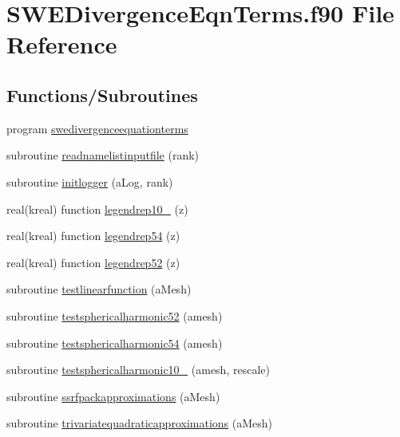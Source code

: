 \hypertarget{SWEDivergenceEqnTerms_8f90}{\section{S\+W\+E\+Divergence\+Eqn\+Terms.\+f90 File Reference}
\label{SWEDivergenceEqnTerms_8f90}
}
\subsection*{Functions/\+Subroutines}
\begin{DoxyCompactItemize}
\item 
program \hyperlink{SWEDivergenceEqnTerms_8f90_a891842420934b166623edb78fd30a0d4}{swedivergenceequationterms}
\item 
subroutine \hyperlink{SWEDivergenceEqnTerms_8f90_accf23045084daea731c39e87a24f6ba5}{readnamelistinputfile} (rank)
\item 
subroutine \hyperlink{SWEDivergenceEqnTerms_8f90_a4cbc518e806ca1044acf283d04abc075}{initlogger} (a\+Log, rank)
\item 
real(kreal) function \hyperlink{SWEDivergenceEqnTerms_8f90_ac0b6d50eecc57a45087fd920dbdee141}{legendrep10\+\_} (z)
\item 
real(kreal) function \hyperlink{SWEDivergenceEqnTerms_8f90_aac357529279a325e65d57a2e8ae325a7}{legendrep54} (z)
\item 
real(kreal) function \hyperlink{SWEDivergenceEqnTerms_8f90_ae9899fe10261dec4ceb5a4374513c15b}{legendrep52} (z)
\item 
subroutine \hyperlink{SWEDivergenceEqnTerms_8f90_a71f6723b7fb4f750e9e1f3830dd09231}{testlinearfunction} (a\+Mesh)
\item 
subroutine \hyperlink{SWEDivergenceEqnTerms_8f90_a8bc719b10178af31d98e0bd2ea8730e4}{testsphericalharmonic52} (amesh)
\item 
subroutine \hyperlink{SWEDivergenceEqnTerms_8f90_a79de79fb4db2e8aa6d5ac06aa6777010}{testsphericalharmonic54} (amesh)
\item 
subroutine \hyperlink{SWEDivergenceEqnTerms_8f90_a4e309bf258ed9840178206987394d981}{testsphericalharmonic10\+\_} (amesh, rescale)
\item 
subroutine \hyperlink{SWEDivergenceEqnTerms_8f90_a8ee794a2775dde1e1d19119b066dc4b4}{ssrfpackapproximations} (a\+Mesh)
\item 
subroutine \hyperlink{SWEDivergenceEqnTerms_8f90_a5da25d9e381537060c209f61d2ccb886}{trivariatequadraticapproximations} (a\+Mesh)

\end{DoxyCompactItemize}
